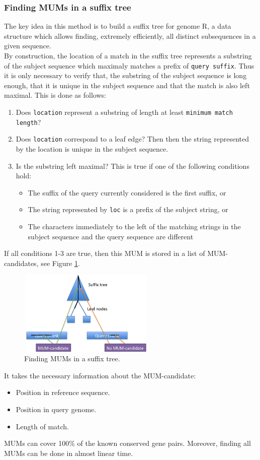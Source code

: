 \documentclass[3p,times]{elsarticle}
\begin{document}
\subsubsection{Finding MUMs in a suffix tree} 
The key idea in this method is to build a suffix tree for genome R, a data structure which allows finding, extremely efficiently, all distinct subsequences in a given sequence.\\
  By construction, the location of a match in the suffix tree represents a substring of the subject sequence which maximaly matches a prefix of
  \texttt{query suffix}. Thus it is only necessary to verify that, the substring of the subject sequence is long enough, that it is unique in the subject sequence and that 
  the match is also left maximal. This is done as follows:
  
  \begin{enumerate}
  \item
  Does \texttt{location} represent a substring of length at least \texttt{minimum match length}?
  \item 
  Does \texttt{location} correspond to a leaf edge? Then then the string represented by the location is unique in the subject sequence.
  \item 
  Is the substring left maximal? This is true if one of the following conditions hold:
  \begin{itemize}
  \item 
  The suffix of the query currently considered is the first suffix, or 
  \item
  The string represented by \texttt{loc} is a prefix of the subject string,  or
  \item 
  The characters immediately to the left of the matching strings in the subject sequence and the query sequence are different
  \end{itemize}
  \end{enumerate}
  If all conditions 1-3 are true, then this MUM is stored in a list of MUM-candidates, see Figure \ref{candidates}. 
 \begin{figure}[htb]  
 \begin{center} 
  \includegraphics[width=6.5cm,height=4cm]{MUM-candidates.png}
 \end{center} 
 \caption{Finding MUMs in a suffix tree.} 
 \label{candidates} 
 \end{figure}  
  It takes the necessary information about the MUM-candidate:
  \begin{itemize}
    \item Position in reference sequence.
    \item Position in query genome.
    \item Length of match.
  \end{itemize}
MUMs can cover 100\% of the known  conserved gene pairs. Moreover, finding all MUMs  can be done in almost linear time.
\end{document}
